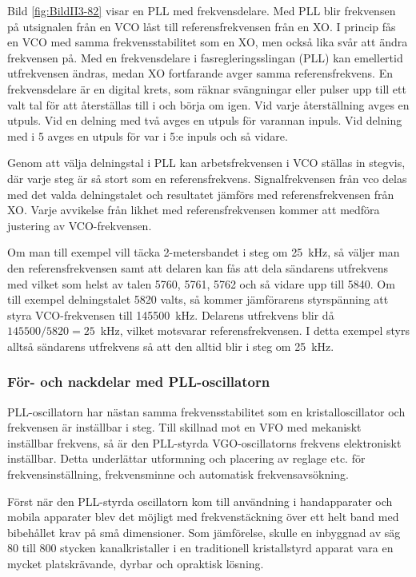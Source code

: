 Bild \ref{fig:BildII3-82} visar en PLL med frekvensdelare.
Med PLL blir frekvensen på utsignalen från en VCO låst till referensfrekvensen
från en XO.
I princip fås en VCO med samma frekvensstabilitet som en XO, men också lika
svår att ändra frekvensen på.
Med en frekvensdelare i fasregleringsslingan (PLL) kan emellertid utfrekvensen
ändras, medan XO fortfarande avger samma referensfrekvens.
En frekvensdelare är en digital krets, som räknar svängningar eller pulser upp
till ett valt tal för att återställas till i och börja om igen.
Vid varje återställning avges en utpuls.
Vid en delning med två avges en utpuls för varannan inpuls.
Vid delning med i 5 avges en utpuls för var i 5:e inpuls och så vidare.

Genom att välja delningstal i PLL kan arbetsfrekvensen i VCO ställas
in stegvis, där varje steg är så stort som en referensfrekvens.
Signalfrekvensen från vco delas med det valda delningstalet och resultatet
jämförs med referensfrekvensen från XO.
Varje avvikelse från likhet med referensfrekvensen kommer att
medföra justering av VCO-frekvensen.

Om man till exempel vill täcka 2-metersbandet i steg om 25~kHz, så väljer man
den referensfrekvensen samt att delaren kan fås att dela sändarens utfrekvens
med vilket som helst av talen 5760, 5761, 5762 och så vidare upp till 5840.
Om till exempel delningstalet 5820 valts, så kommer jämförarens styrspänning att
styra VCO-frekvensen till 145500~kHz.
Delarens utfrekvens blir då \(145500/5820 = 25\)~kHz, vilket motsvarar
referensfrekvensen.
I detta exempel styrs alltså sändarens utfrekvens så att den alltid blir i steg
om 25~kHz.

\subsubsection{För- och nackdelar med PLL-oscillatorn}

PLL-oscillatorn har nästan samma frekvensstabilitet som en
kristalloscillator och frekvensen är inställbar i steg.
Till skillnad mot en VFO med mekaniskt inställbar frekvens, så är den PLL-styrda
VGO-oscillatorns frekvens elektroniskt inställbar.
Detta underlättar utformning och placering av reglage etc. för
frekvensinställning, frekvensminne och automatisk frekvensavsökning.

Först när den PLL-styrda oscillatorn kom till användning i handapparater och
mobila apparater blev det möjligt med frekvenstäckning över ett helt band med
bibehållet krav på små dimensioner.
Som jämförelse, skulle en inbyggnad av säg 80 till 800 stycken kanalkristaller
i en traditionell kristallstyrd apparat vara en mycket platskrävande, dyrbar
och opraktisk lösning.

